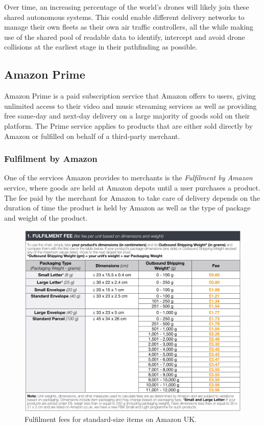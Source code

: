 \documentclass[a4paper,12pt,titlepage]{article}
\begin{document}
Over time, an increasing percentage of the world's drones will likely join these shared autonomous systems. This could enable different delivery networks to manage their own fleets as their own air traffic controllers, all the while making use of the shared pool of readable data to identify, intercept and avoid drone collisions at the earliest stage in their pathfinding as possible.

\subsection{Amazon Prime}
Amazon Prime is a paid subscription service that Amazon offers to users, giving unlimited access to their video and music streaming services as well as providing free same-day and next-day delivery on a large majority of goods sold on their platform. The Prime service applies to products that are either sold directly by Amazon or fulfilled on behalf of a third-party merchant.

\subsubsection{Fulfilment by Amazon}
One of the services Amazon provides to merchants is the \textit{Fulfilment by Amazon} service, where goods are held at Amazon depots until a user purchases a product. The fee paid by the merchant for Amazon to take care of delivery depends on the duration of time the product is held by Amazon as well as the type of package and weight of the product.

\begin{figure}[!hbpt]
  \center
  \includegraphics[width=0.9\linewidth]{img/fulfilled_by_amazon_table.png}
  \caption{Fulfilment fees for standard-size items on Amazon UK. \cite{Channel2017}}
  \label{fig:fulfilled_by_amazon_table}
\end{figure}
\end{document}
